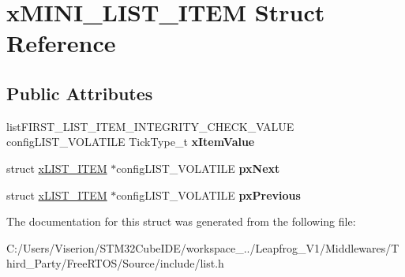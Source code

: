 \hypertarget{structx_m_i_n_i___l_i_s_t___i_t_e_m}{}\section{x\+M\+I\+N\+I\+\_\+\+L\+I\+S\+T\+\_\+\+I\+T\+EM Struct Reference}
\label{structx_m_i_n_i___l_i_s_t___i_t_e_m}
\subsection*{Public Attributes}
\begin{DoxyCompactItemize}
\item 
\mbox{\label{structx_m_i_n_i___l_i_s_t___i_t_e_m_aae79c54ac1efa30959e68604cc23b29e}} 
list\+F\+I\+R\+S\+T\+\_\+\+L\+I\+S\+T\+\_\+\+I\+T\+E\+M\+\_\+\+I\+N\+T\+E\+G\+R\+I\+T\+Y\+\_\+\+C\+H\+E\+C\+K\+\_\+\+V\+A\+L\+UE config\+L\+I\+S\+T\+\_\+\+V\+O\+L\+A\+T\+I\+LE Tick\+Type\+\_\+t {\bfseries x\+Item\+Value}
\item 
\mbox{\label{structx_m_i_n_i___l_i_s_t___i_t_e_m_aa7ae770b0f10daeb9ac76c6f7dd5608e}} 
struct \mbox{\hyperlink{structx_l_i_s_t___i_t_e_m}{x\+L\+I\+S\+T\+\_\+\+I\+T\+EM}} $\ast$config\+L\+I\+S\+T\+\_\+\+V\+O\+L\+A\+T\+I\+LE {\bfseries px\+Next}
\item 
\mbox{\label{structx_m_i_n_i___l_i_s_t___i_t_e_m_a732c666bb97560eb1b094a2c411269ab}} 
struct \mbox{\hyperlink{structx_l_i_s_t___i_t_e_m}{x\+L\+I\+S\+T\+\_\+\+I\+T\+EM}} $\ast$config\+L\+I\+S\+T\+\_\+\+V\+O\+L\+A\+T\+I\+LE {\bfseries px\+Previous}
\end{DoxyCompactItemize}


The documentation for this struct was generated from the following file\+:\begin{DoxyCompactItemize}
\item 
C\+:/\+Users/\+Viserion/\+S\+T\+M32\+Cube\+I\+D\+E/workspace\+\_../\+Leapfrog\+\_\+\+V1/\+Middlewares/\+Third\+\_\+\+Party/\+Free\+R\+T\+O\+S/\+Source/include/list.\+h\end{DoxyCompactItemize}
